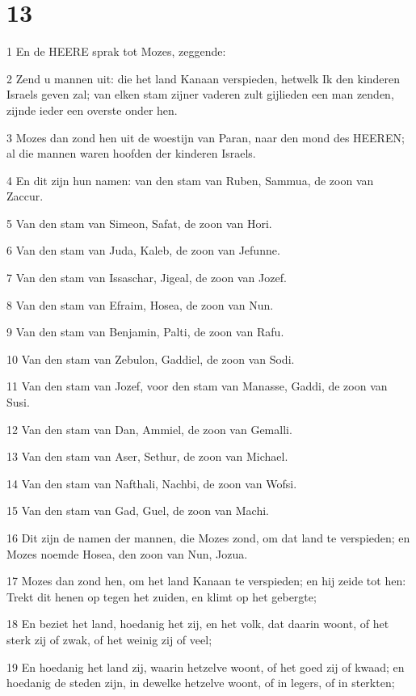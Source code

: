 \chapter{13}

\par 1 En de HEERE sprak tot Mozes, zeggende:
\par 2 Zend u mannen uit: die het land Kanaan verspieden, hetwelk Ik den kinderen Israels geven zal; van elken stam zijner vaderen zult gijlieden een man zenden, zijnde ieder een overste onder hen.
\par 3 Mozes dan zond hen uit de woestijn van Paran, naar den mond des HEEREN; al die mannen waren hoofden der kinderen Israels.
\par 4 En dit zijn hun namen: van den stam van Ruben, Sammua, de zoon van Zaccur.
\par 5 Van den stam van Simeon, Safat, de zoon van Hori.
\par 6 Van den stam van Juda, Kaleb, de zoon van Jefunne.
\par 7 Van den stam van Issaschar, Jigeal, de zoon van Jozef.
\par 8 Van den stam van Efraim, Hosea, de zoon van Nun.
\par 9 Van den stam van Benjamin, Palti, de zoon van Rafu.
\par 10 Van den stam van Zebulon, Gaddiel, de zoon van Sodi.
\par 11 Van den stam van Jozef, voor den stam van Manasse, Gaddi, de zoon van Susi.
\par 12 Van den stam van Dan, Ammiel, de zoon van Gemalli.
\par 13 Van den stam van Aser, Sethur, de zoon van Michael.
\par 14 Van den stam van Nafthali, Nachbi, de zoon van Wofsi.
\par 15 Van den stam van Gad, Guel, de zoon van Machi.
\par 16 Dit zijn de namen der mannen, die Mozes zond, om dat land te verspieden; en Mozes noemde Hosea, den zoon van Nun, Jozua.
\par 17 Mozes dan zond hen, om het land Kanaan te verspieden; en hij zeide tot hen: Trekt dit henen op tegen het zuiden, en klimt op het gebergte;
\par 18 En beziet het land, hoedanig het zij, en het volk, dat daarin woont, of het sterk zij of zwak, of het weinig zij of veel;
\par 19 En hoedanig het land zij, waarin hetzelve woont, of het goed zij of kwaad; en hoedanig de steden zijn, in dewelke hetzelve woont, of in legers, of in sterkten;
